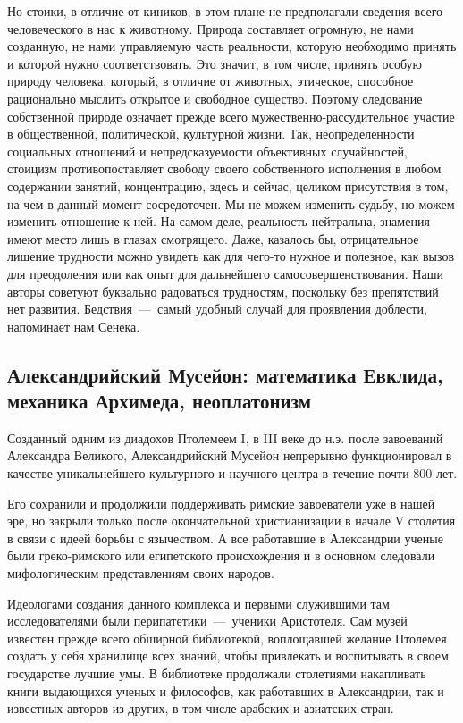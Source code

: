 Но стоики, в отличие от киников, в этом плане не
предполагали сведения всего человеческого в нас к животному. Природа составляет
огромную, не нами созданную, не нами управляемую часть реальности, которую
необходимо принять и которой нужно соответствовать. Это значит, в том числе,
принять особую природу человека, который, в отличие от животных, этическое,
способное рационально мыслить открытое и свободное существо. Поэтому следование
собственной природе означает прежде всего мужественно-рассудительное участие в
общественной, политической, культурной жизни. Так, неопределенности социальных
отношений и непредсказуемости объективных случайностей, стоицизм
противопоставляет свободу своего собственного исполнения в любом содержании
занятий, концентрацию, здесь и сейчас, целиком присутствия в том, на чем в
данный момент сосредоточен. Мы не можем изменить судьбу, но можем изменить
отношение к ней. На самом деле, реальность нейтральна, знамения имеют место лишь в глазах смотрящего. Даже, казалось бы, отрицательное лишение трудности можно увидеть как для чего-то нужное и полезное, как вызов для преодоления или как опыт для дальнейшего самосовершенствования. Наши авторы советуют буквально радоваться трудностям, поскольку без препятствий нет развития. Бедствия~---~самый удобный случай для проявления доблести, напоминает нам Сенека.

\subsection{Александрийский Мусейон: математика Евклида, механика Архимеда, неоплатонизм}

Созданный одним из диадохов Птолемеем I, в III веке до н.э. после
завоеваний Александра Великого, Александрийский Мусейон непрерывно функционировал в качестве уникальнейшего культурного и научного центра в течение почти 800 лет.

Его сохранили и продолжили поддерживать римские завоеватели уже в нашей эре, но закрыли только после окончательной христианизации в начале V столетия в связи с идеей борьбы с язычеством. А все работавшие в Александрии ученые были греко-римского или египетского происхождения и в основном следовали мифологическим представлениям своих народов. 

Идеологами создания данного комплекса и первыми служившими там исследователями были перипатетики~---~ученики Аристотеля.
Сам музей известен прежде всего обширной библиотекой, воплощавшей желание Птолемея создать у себя хранилище всех знаний, чтобы привлекать и воспитывать в своем государстве лучшие умы. В библиотеке продолжали столетиями накапливать книги выдающихся ученых и философов, как работавших в Александрии, так и известных авторов из других, в том числе арабских и азиатских стран. 

